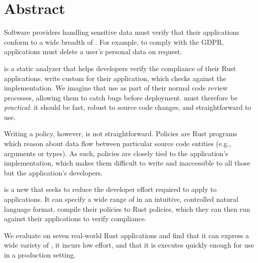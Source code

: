 \chapter*{Abstract}

%
Software providers handling sensitive data must verify that their applications conform to a wide breadth of \policies.
%
For example, to comply with the GDPR, applications must delete a user's personal data on request.
% 

\sys{} is a static analyzer that helps developers verify the compliance of their Rust applications.
%
\Devs{} write custom \policies{} for their application, which \sys{} checks against the implementation.
%
We imagine that \devs{} use \sys{} as part of their normal code review processes, allowing them to catch bugs before deployment.
%
\sys{} must therefore be \emph{practical}: it should be fast, robust to source code changes, and straightforward to use.

Writing a \sys{} policy, however, is not straightforward.
%
Policies are Rust programs which reason about 
data flow between particular source code entities (e.g., arguments or types).
%
As such, policies are closely tied to the application's implementation,
which makes them difficult to write and inaccessible to all those but the application's developers.

\syslang{} is a new \policylang{} that seeks to reduce the developer effort required to apply \sys{} to applications.
%
It can specify a wide range of \policies{} in an intuitive, 
controlled natural language format.
%
\Devs{} compile their \syslang{} policies to \sys{} Rust policies,
which they can then run against their applications to verify compliance.
%

We evaluate \syslang{} on seven real-world Rust applications and find that it can
express a wide variety of \policies{}, 
it incurs low \dev{} effort,
and that it is executes quickly enough for use in a production setting.
